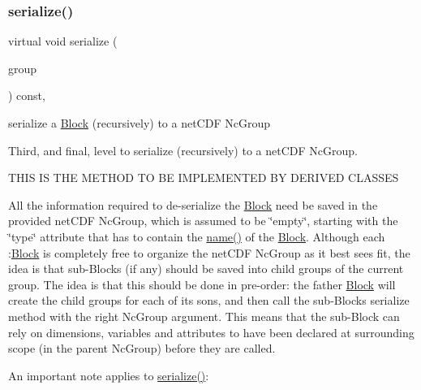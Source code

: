 \subsubsection{\texorpdfstring{serialize()}{serialize()}}
{\footnotesize\ttfamily virtual void serialize (\begin{DoxyParamCaption}\item[{net\+C\+D\+F\+::\+Nc\+Group \&\&}]{group }\end{DoxyParamCaption}) const\hspace{0.3cm}{\ttfamily [override]}, {\ttfamily [virtual]}}



serialize a \mbox{\hyperlink{class_s_m_spp__di__unipi__it_1_1_block}{Block}} (recursively) to a net\+C\+DF Nc\+Group 

Third, and final, level to serialize (recursively) to a net\+C\+DF Nc\+Group. \begin{DoxyVerb}THIS IS THE METHOD TO BE IMPLEMENTED BY DERIVED CLASSES
\end{DoxyVerb}


All the information required to de-\/serialize the \mbox{\hyperlink{class_s_m_spp__di__unipi__it_1_1_block}{Block}} need be saved in the provided net\+C\+DF Nc\+Group, which is assumed to be \char`\"{}empty\char`\"{}, starting with the \char`\"{}type\char`\"{} attribute that has to contain the \mbox{\hyperlink{class_s_m_spp__di__unipi__it_1_1_block_a738e9dfd6e00507da219e4bd5a3f6be9}{name()}} of the \mbox{\hyperlink{class_s_m_spp__di__unipi__it_1_1_block}{Block}}. Although each \+:\mbox{\hyperlink{class_s_m_spp__di__unipi__it_1_1_block}{Block}} is completely free to organize the net\+C\+DF Nc\+Group as it best sees fit, the idea is that sub-\/\+Blocks (if any) should be saved into child groups of the current group. The idea is that this should be done in pre-\/order\+: the father \mbox{\hyperlink{class_s_m_spp__di__unipi__it_1_1_block}{Block}} will create the child groups for each of its sons, and then call the sub-\/\+Block\textquotesingle{}s serialize method with the right Nc\+Group argument. This means that the sub-\/\+Block can rely on dimensions, variables and attributes to have been declared at surrounding scope (in the parent Nc\+Group) before they are called.

An important note applies to \mbox{\hyperlink{class_s_m_spp__di__unipi__it_1_1_structured_m_i_l_p_block_aefb3f33afdab2b6f4aef3f926c10df51}{serialize()}}\+:



